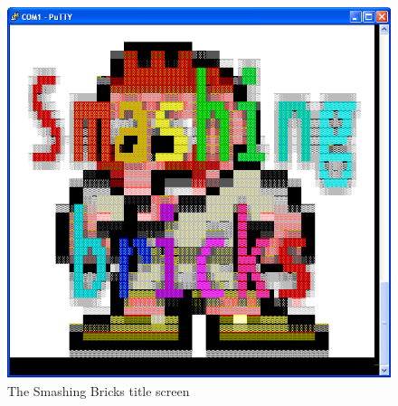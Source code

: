 \begin{figure}
	\center
	\includegraphics[scale=0.5]{pictures/title_screen.PNG}
	\caption{The Smashing Bricks title screen}
	\label{title}
\end{figure}

